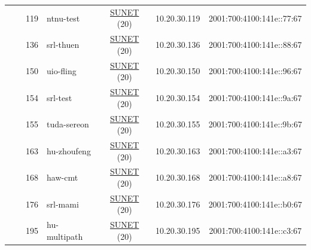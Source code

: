\begin{small}
\begin{center}
\begin{longtable}{|c|c|c|c|c|c|c|c|}
  &  & \tiny{119} & \multicolumn{1}{|l|}{\tiny{ntnu-test}} & \multicolumn{2}{|c|}{\tiny{\href{http://www.sunet.se}{SUNET} (20)}} & \tiny{10.20.30.119} & \tiny{2001:700:4100:141e::77:67} \\* \cline{3-3}\cline{4-4}\cline{5-5}\cline{6-6}\cline{7-7}\cline{8-8}
  &  & \tiny{136} & \multicolumn{1}{|l|}{\tiny{srl-thuen}} & \multicolumn{2}{|c|}{\tiny{\href{http://www.sunet.se}{SUNET} (20)}} & \tiny{10.20.30.136} & \tiny{2001:700:4100:141e::88:67} \\* \cline{3-3}\cline{4-4}\cline{5-5}\cline{6-6}\cline{7-7}\cline{8-8}
  &  & \tiny{150} & \multicolumn{1}{|l|}{\tiny{uio-fling}} & \multicolumn{2}{|c|}{\tiny{\href{http://www.sunet.se}{SUNET} (20)}} & \tiny{10.20.30.150} & \tiny{2001:700:4100:141e::96:67} \\* \cline{3-3}\cline{4-4}\cline{5-5}\cline{6-6}\cline{7-7}\cline{8-8}
  &  & \tiny{154} & \multicolumn{1}{|l|}{\tiny{srl-test}} & \multicolumn{2}{|c|}{\tiny{\href{http://www.sunet.se}{SUNET} (20)}} & \tiny{10.20.30.154} & \tiny{2001:700:4100:141e::9a:67} \\* \cline{3-3}\cline{4-4}\cline{5-5}\cline{6-6}\cline{7-7}\cline{8-8}
  &  & \tiny{155} & \multicolumn{1}{|l|}{\tiny{tuda-sereon}} & \multicolumn{2}{|c|}{\tiny{\href{http://www.sunet.se}{SUNET} (20)}} & \tiny{10.20.30.155} & \tiny{2001:700:4100:141e::9b:67} \\* \cline{3-3}\cline{4-4}\cline{5-5}\cline{6-6}\cline{7-7}\cline{8-8}
  &  & \tiny{163} & \multicolumn{1}{|l|}{\tiny{hu-zhoufeng}} & \multicolumn{2}{|c|}{\tiny{\href{http://www.sunet.se}{SUNET} (20)}} & \tiny{10.20.30.163} & \tiny{2001:700:4100:141e::a3:67} \\* \cline{3-3}\cline{4-4}\cline{5-5}\cline{6-6}\cline{7-7}\cline{8-8}
  &  & \tiny{168} & \multicolumn{1}{|l|}{\tiny{haw-cmt}} & \multicolumn{2}{|c|}{\tiny{\href{http://www.sunet.se}{SUNET} (20)}} & \tiny{10.20.30.168} & \tiny{2001:700:4100:141e::a8:67} \\* \cline{3-3}\cline{4-4}\cline{5-5}\cline{6-6}\cline{7-7}\cline{8-8}
  &  & \tiny{176} & \multicolumn{1}{|l|}{\tiny{srl-mami}} & \multicolumn{2}{|c|}{\tiny{\href{http://www.sunet.se}{SUNET} (20)}} & \tiny{10.20.30.176} & \tiny{2001:700:4100:141e::b0:67} \\* \cline{3-3}\cline{4-4}\cline{5-5}\cline{6-6}\cline{7-7}\cline{8-8}
  &  & \tiny{195} & \multicolumn{1}{|l|}{\tiny{hu-multipath}} & \multicolumn{2}{|c|}{\tiny{\href{http://www.sunet.se}{SUNET} (20)}} & \tiny{10.20.30.195} & \tiny{2001:700:4100:141e::c3:67} \\ \hline
\end{longtable}
\end{center}
\end{small}




